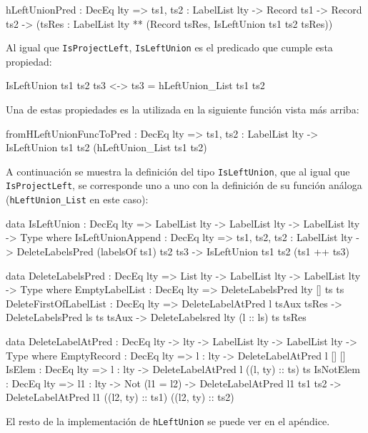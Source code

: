 \begin{code}
hLeftUnionPred : DecEq lty => {ts1, ts2 : LabelList lty} ->
  Record ts1 -> Record ts2 ->
  (tsRes : LabelList lty ** (Record tsRes,
    IsLeftUnion ts1 ts2 tsRes))
\end{code}

Al igual que \texttt{IsProjectLeft}, \texttt{IsLeftUnion} es el predicado que cumple esta propiedad:

\begin{code}
IsLeftUnion ts1 ts2 ts3 <-> ts3 = hLeftUnion_List ts1 ts2
\end{code}

Una de estas propiedades es la utilizada en la siguiente función vista más arriba:

\begin{code}
fromHLeftUnionFuncToPred : DecEq lty =>
  {ts1, ts2 : LabelList lty} ->
  IsLeftUnion ts1 ts2 (hLeftUnion_List ts1 ts2)
\end{code}

A continuación se muestra la definición del tipo \texttt{IsLeftUnion}, que al igual que \texttt{IsProjectLeft}, se corresponde uno a uno con la definición de su función análoga (\texttt{hLeftUnion\_List} en este caso):

\begin{code}
data IsLeftUnion : DecEq lty => LabelList lty -> LabelList lty ->
  LabelList lty -> Type where
  IsLeftUnionAppend : DecEq lty =>
    {ts1, ts2, ts2 : LabelList lty} ->
    DeleteLabelsPred (labelsOf ts1) ts2 ts3 ->
    IsLeftUnion ts1 ts2 (ts1 ++ ts3)

data DeleteLabelsPred : DecEq lty => List lty -> LabelList lty ->
  LabelList lty -> Type where
  EmptyLabelList : DecEq lty =>
    DeleteLabelsPred {lty} [] ts ts
  DeleteFirstOfLabelList : DecEq lty =>
    DeleteLabelAtPred l tsAux tsRes ->
    DeleteLabelsPred ls ts tsAux ->
    DeleteLabelsred {lty} (l :: ls) ts tsRes

data DeleteLabelAtPred : DecEq lty -> lty -> LabelList lty ->
  LabelList lty -> Type where
  EmptyRecord : DecEq lty => {l : lty} ->
    DeleteLabelAtPred l [] []
  IsElem : DecEq lty => {l : lty} ->
    DeleteLabelAtPred l ((l, ty) :: ts) ts
  IsNotElem : DecEq lty => {l1 : lty} -> Not (l1 = l2) ->
    DeleteLabelAtPred l1 ts1 ts2 ->
    DeleteLabelAtPred l1 ((l2, ty) :: ts1) ((l2, ty) :: ts2)
\end{code}

El resto de la implementación de \texttt{hLeftUnion} se puede ver en el apéndice.

